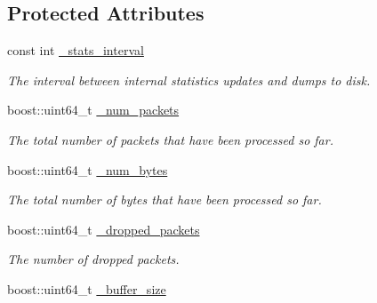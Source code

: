 \subsection*{Protected Attributes}
\begin{DoxyCompactItemize}
\item 
\hypertarget{class_stats_writer_a9ff06ffdee4bc6cd5cb4829acbae5f45}{
const int \hyperlink{class_stats_writer_a9ff06ffdee4bc6cd5cb4829acbae5f45}{\_\-stats\_\-interval}}
\label{class_stats_writer_a9ff06ffdee4bc6cd5cb4829acbae5f45}

\begin{DoxyCompactList}\small\item\em The interval between internal statistics updates and dumps to disk. \end{DoxyCompactList}\item 
\hypertarget{class_stats_writer_ac5a9b8e756ebaab1fa390b5ef9574b4c}{
boost::uint64\_\-t \hyperlink{class_stats_writer_ac5a9b8e756ebaab1fa390b5ef9574b4c}{\_\-num\_\-packets}}
\label{class_stats_writer_ac5a9b8e756ebaab1fa390b5ef9574b4c}

\begin{DoxyCompactList}\small\item\em The total number of packets that have been processed so far. \end{DoxyCompactList}\item 
\hypertarget{class_stats_writer_ae2d006b00ac3d7d5b4fdef24f593cb5e}{
boost::uint64\_\-t \hyperlink{class_stats_writer_ae2d006b00ac3d7d5b4fdef24f593cb5e}{\_\-num\_\-bytes}}
\label{class_stats_writer_ae2d006b00ac3d7d5b4fdef24f593cb5e}

\begin{DoxyCompactList}\small\item\em The total number of bytes that have been processed so far. \end{DoxyCompactList}\item 
\hypertarget{class_stats_writer_aa0165232f168f34bfeda9bf4526920ab}{
boost::uint64\_\-t \hyperlink{class_stats_writer_aa0165232f168f34bfeda9bf4526920ab}{\_\-dropped\_\-packets}}
\label{class_stats_writer_aa0165232f168f34bfeda9bf4526920ab}

\begin{DoxyCompactList}\small\item\em The number of dropped packets. \end{DoxyCompactList}\item 
\hypertarget{class_stats_writer_a536e5799c8bb5303591aaaea6ab9ac16}{
boost::uint64\_\-t \hyperlink{class_stats_writer_a536e5799c8bb5303591aaaea6ab9ac16}{\_\-buffer\_\-size}}
\label{class_stats_writer_a536e5799c8bb5303591aaaea6ab9ac16}


\end{DoxyCompactItemize}
